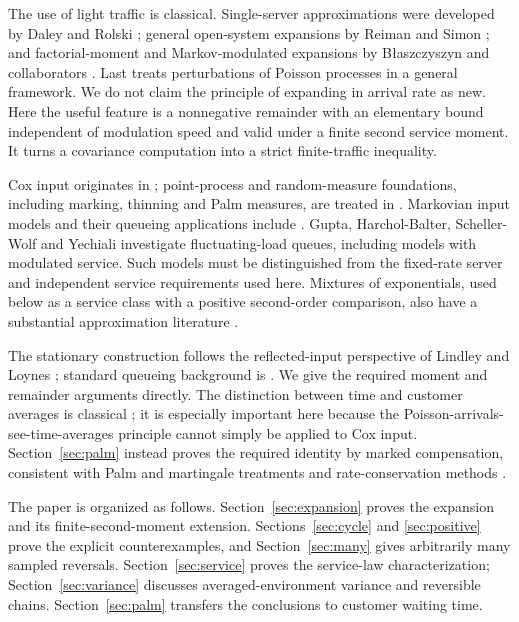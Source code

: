 \documentclass[aap,preprint]{imsart}
\numberwithin{equation}{section}
\theoremstyle{plain}
\theoremstyle{definition}
\newcommand{\1}{\mathbf 1}
\begin{document}
The use of light traffic is classical. Single-server approximations were developed by Daley and Rolski \cite{DR84,DR91,DR94}; general open-system expansions by Reiman and Simon \cite{RS89}; and factorial-moment and Markov-modulated expansions by B{\l}aszczyszyn and collaborators \cite{Blasz95,BFS95}. Last \cite{Last14} treats perturbations of Poisson processes in a general framework. We do not claim the principle of expanding in arrival rate as new. Here the useful feature is a nonnegative remainder with an elementary bound independent of modulation speed and valid under a finite second service moment. It turns a covariance computation into a strict finite-traffic inequality.

Cox input originates in \cite{Cox55}; point-process and random-measure foundations, including marking, thinning and Palm measures, are treated in \cite{DVJ03,DVJ08,Kallenberg17,LP18}. Markovian input models and their queueing applications include \cite{Neuts79,YN71,HL86}. Gupta, Harchol-Balter, Scheller-Wolf and Yechiali \cite{GHSY06} investigate fluctuating-load queues, including models with modulated service. Such models must be distinguished from the fixed-rate server and independent service requirements used here. Mixtures of exponentials, used below as a service class with a positive second-order comparison, also have a substantial approximation literature \cite{Whitt84}.

The stationary construction follows the reflected-input perspective of Lindley and Loynes \cite{Lindley52,Loynes62}; standard queueing background is \cite{Asmussen03}. We give the required moment and remainder arguments directly. The distinction between time and customer averages is classical \cite{Brumelle71,HS80}; it is especially important here because the Poisson-arrivals-see-time-averages principle \cite{Wolff82} cannot simply be applied to Cox input. Section~\ref{sec:palm} instead proves the required identity by marked compensation, consistent with Palm and martingale treatments \cite{Bremaud81,BB03} and rate-conservation methods \cite{Miyazawa94}.

The paper is organized as follows. Section~\ref{sec:expansion} proves the expansion and its finite-second-moment extension. Sections~\ref{sec:cycle} and \ref{sec:positive} prove the explicit counterexamples, and Section~\ref{sec:many} gives arbitrarily many sampled reversals. Section~\ref{sec:service} proves the service-law characterization; Section~\ref{sec:variance} discusses averaged-environment variance and reversible chains. Section~\ref{sec:palm} transfers the conclusions to customer waiting time.
\end{document}
